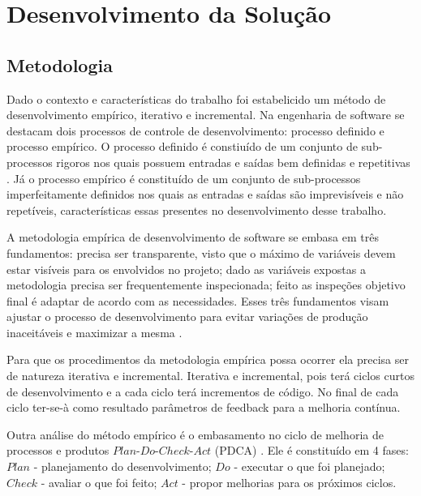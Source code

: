 \chapter{Desenvolvimento da Solução}
\label{chap:solucaocompleta}

\section{Metodologia}

Dado o contexto e características do trabalho foi estabelicido um método de desenvolvimento empírico, iterativo e incremental. Na engenharia de software se destacam dois processos de controle de desenvolvimento: processo definido e processo empírico. O processo definido é constiuído de um conjunto de sub-processos rigoros nos quais possuem entradas e saídas bem definidas e repetitivas \cite{rup}. Já o processo empírico é constituído de um conjunto de sub-processos imperfeitamente definidos nos quais as entradas e saídas são imprevisíveis e não repetíveis, características essas presentes no desenvolvimento desse trabalho.

A metodologia empírica de desenvolvimento de software se embasa em três fundamentos: precisa ser transparente, visto que o máximo de variáveis devem estar visíveis para os envolvidos no projeto; dado as variáveis expostas a metodologia precisa ser frequentemente inspecionada; feito as inspeções objetivo final é adaptar de acordo com as necessidades. Esses três fundamentos visam ajustar o processo de desenvolvimento para evitar variações de produção inaceitáveis e maximizar a mesma \cite{empirical}.

Para que os procedimentos da metodologia empírica possa ocorrer ela precisa ser de natureza iterativa e incremental. Iterativa e incremental, pois terá ciclos curtos de desenvolvimento e a cada ciclo terá incrementos de código. No final de cada ciclo ter-se-à como resultado parâmetros de feedback para a melhoria contínua.

Outra análise do método empírico é o embasamento no ciclo de melhoria de processos e produtos $Plan$-$Do$-$Check$-$Act$ (PDCA) \cite{pdca}. Ele é constituído em 4 fases: $Plan$ - planejamento do desenvolvimento; $Do$ - executar o que foi planejado; $Check$ - avaliar o que foi feito; $Act$ - propor melhorias para os próximos ciclos.

